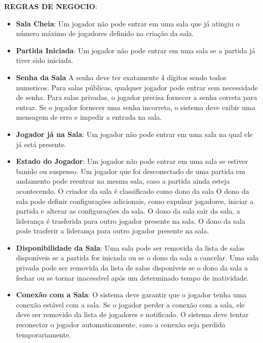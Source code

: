     \textbf{REGRAS DE NEGOCIO}:
    \begin{itemize}
        \item \textbf{Sala Cheia}: Um jogador não pode entrar em uma sala que já atingiu o número máximo de jogadores definido na criação da sala.
        \item \textbf{Partida Iniciada}: Um jogador não pode entrar em uma sala se a partida já tiver sido iniciada.
        \item \textbf{Senha da Sala}
            \subitem A senha deve ter exatamente 4 dígitos sendo todos numericos.
            \subitem Para salas públicas, qualquer jogador pode entrar sem necessidade de senha.
            \subitem Para salas privadas, o jogador precisa fornecer a senha correta para entrar.
            \subitem Se o jogador fornecer uma senha incorreta, o sistema deve exibir uma mensagem de erro e impedir a entrada na sala.
        \item \textbf{Jogador já na Sala}:  Um jogador não pode entrar em uma sala na qual ele já está presente.
        \item \textbf{Estado do Jogador}: 
            \subitem Um jogador não pode entrar em uma sala se estiver banido ou suspenso.
            \subitem Um jogador que foi desconectado de uma partida em andamento pode reentrar na mesma sala, caso a partida ainda esteja acontecendo.
            \subitem O criador da sala é classificado como dono da sala
            \subitem O dono da sala pode definir configurações adicionais, como expulsar jogadores, iniciar a partida e alterar as configurações da sala.
            \subitem O dono da sala sair da sala, a liderança é trasferida para outro jogador presente na sala.
            \subitem O dono da sala pode trasferir a liderança para outro jogador presente na sala.
        \item \textbf{Disponibilidade da Sala}: 
            \subitem Uma sala pode ser removida da lista de salas disponíveis se a partida for iniciada ou se o dono da sala a cancelar.
            \subitem Uma sala privada pode ser removida da lista de salas disponíveis se o dono da sala a fechar ou se tornar inacessível após um determinado tempo de inatividade.
        \item \textbf{Conexão com a Sala}:
            \subitem O sistema deve garantir que o jogador tenha uma conexão estável com a sala.
            \subitem Se o jogador perder a conexão com a sala, ele deve ser removido da lista de jogadores e notificado.
            \subitem O sistema deve tentar reconectar o jogador automaticamente, caso a conexão seja perdida temporariamente.     
    \end{itemize}
